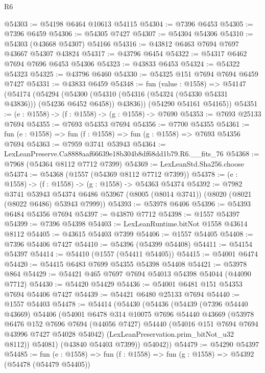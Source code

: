 \begin{lexlean}{R6}
\begin{coremodule}
@54303 := @54198 @6464 @10613 @54115
@54304 := @7396 @6453
@54305 := @7396 @6459
@54306 := @54305 @7427
@54307 := @54304 @54306
@54310 := @54303 (@43668 @54307) @54166
@54316 := @43812 @6463 @7694 @7697 @43667 @54307 @43824
@54317 := @43796 @6454
@54322 := @54317 @6462 @7694 @7696 @6453 @54306
@54323 := @43833 @6453
@54324 := @54322 @54323
@54325 := @43796 @6460
@54330 := @54325 @151 @7694 @7694 @6459 @7427
@54331 := @43833 @6459
@54348 := fun (value : @1558) =>
  @54147
    (@54174
      (@54294
        (@54300 (@54310 (@54316 (@54324 (@54330 @54331 @43836))) (@54236 @6452 @6458)) @43836))
      (@54290 @54161 @54165))
@54351 := (e : @1558) -> (f : @1558) -> (g : @1558) -> @7690
@54353 := @7693 @25133 @7694
@54355 := @7693 @54353 @7694
@54356 := @7700 @54355
@54361 := fun (e : @1558) => fun (f : @1558) => fun (g : @1558) => @7693 @54356 @7694
@54363 := @7959 @3741 @53943
@54364 := LexLeanPreserve.Ca8888aaf66639e18b304b8df68dd1b79.R6.__fits_76
@54368 := @7968 (@54364 @8112 @7712 @7399)
@54369 := LexLeanStd.Sha256.choose
@54374 := @54368 (@1557 (@54369 @8112 @7712 @7399))
@54378 := (e : @1558) -> (f : @1558) -> (g : @1558) -> @54363 @54374
@54392 := @7982
    @3741
    @53943
    @54374
    @6486
    @53967
    (@8005 (@8014 @3741))
    (@8020 (@8021 (@8022 @6486) @53943 @7999))
@54393 := @53978 @6406
@54396 := @54393 @6484 @54356 @7694
@54397 := @43870 @7712
@54398 := @1557 @54397
@54399 := @7396 @54398
@54403 := LexLeanRuntime.bitNot @1558 @43614 @8112
@54405 := @43615 @54403 @7399
@54406 := @1557 @54405
@54408 := @7396 @54406 @7427
@54410 := @54396 (@54399 @54408)
@54411 := @54154 @54397
@54414 := @54410 (@1557 (@54411 @54405))
@54415 := @54001 @6474
@54420 := @54415 @6483 @7699 @54355 @54398 @54408
@54421 := @53978 @864
@54429 := @54421 @465 @7697 @7694 @54013 @54398 @54044 (@44090 @7712)
@54430 := @54420 @54429
@54436 := @54001 @6481 @151 @54353 @7694 @54406 @7427
@54439 := @54421 @6480 @25133 @7694
@54440 := @1557 @54403
@54478 := @54414
    (@54430
      (@54436
        (@54439
          (@7396 @54440 @43669)
          @54406
          (@54001
            @6478
            @314
            @10075
            @7696
            @54440
            @43669
            (@53978
              @6476
              @152
              @7696
              @7694
              (@44056 @7427)
              @54440
              (@54016 @151 @7694 @7694 @43996 @7427 @54028 @54042)
              (LexLeanPreservation.prim_bitNot_u32 @8112))
            @54081)
          (@43840 @54403 @7399))
        @54042))
@54479 := @54290 @54397
@54485 := fun (e : @1558) => fun (f : @1558) => fun (g : @1558) => @54392 (@54478 (@54479 @54405))

\end{coremodule}
\end{lexlean}
